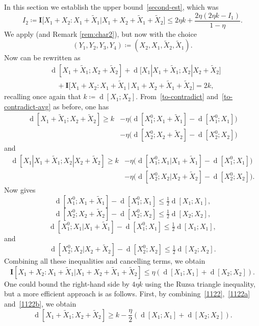 \documentclass[12pt,reqno,tbtags]{amsart}
\theoremstyle{definition}
\theoremstyle{remark}
\renewcommand{\leq}{\leqslant}
\renewcommand{\geq}{\geqslant}
\newcommand{\I}[1]{\mathbf{I}[#1]}
\newcommand{\bigI}[1]{\mathbf{I}\big[#1\big]}
\newcommand{\dist}[2]{{\operatorname{d}[#1;#2]}} %
\newcommand{\costa}[1]{\eta\bigl(\dist{X_1^0}{#1} - \dist{X_1^0}{X_1}\bigr)} %
\newcommand{\costb}[1]{\eta\bigl(\dist{X_2^0}{#1} - \dist{X_2^0}{X_2}\bigr)} %
\newcommand{\bigdist}[2]{{\operatorname{d}\bigl[#1;#2\bigr]}} %
\numberwithin{equation}{section}
\begin{document}
In this section we establish the upper bound~\eqref{second-est}, which was
\[
  I_2 \coloneqq \bigI{ X_1+X_2 : X_1 + \tilde X_1 | X_1+X_2+\tilde X_1+\tilde X_2 } \leq 2 \eta k + \frac{2 \eta (2 \eta k - I_1)}{1 - \eta}.
\]
We apply  (and Remark \ref{rem:char2}), but now with the choice
\[
  (Y_1,Y_2,Y_3,Y_4) \coloneqq (X_2, X_1, \tilde X_2, \tilde X_1).
\]
Now  can be rewritten as
\begin{align*}
  &\dist{X_1+\tilde X_1}{X_2+\tilde X_2} + \bigdist{X_1|X_1+\tilde X_1}{X_2|X_2+\tilde X_2} \\
  &\quad + \bigI{ X_1+X_2 : X_1 + \tilde X_1 \,|\, X_1+X_2+\tilde X_1+\tilde X_2 } = 2k,
\end{align*}
recalling once again that $k \coloneqq \dist{X_1}{X_2}$.  From~\eqref{to-contradict} and~\eqref{to-contradict-avg} as before, one has
\begin{align}
  \nonumber
  \dist{X_1+\tilde X_1}{X_2+\tilde X_2} \geq k &- \costa{X_1+\tilde X_1} \\ &- \costb{X_2+\tilde X_2}
\label{1122}
\end{align}
and
\begin{align*}
  \dist{X_1|X_1+\tilde X_1}{X_2|X_2+\tilde X_2}   \geq k &- \costa{X_1|X_1+\tilde X_1} \\& - \costb{X_2|X_2+\tilde X_2} .
\end{align*}
Now  gives
\begin{equation}\label{1122a} \dist{X^0_1}{X_1+\tilde X_1} - \dist{X^0_1}{X_1} \leq \tfrac{1}{2} \dist{X_1}{X_1},\end{equation}
\begin{equation}\label{1122b}
  \dist{X^0_2}{X_2+\tilde X_2} - \dist{X^0_2}{X_2} \leq \tfrac{1}{2} \dist{X_2}{X_2},
\end{equation}
\[
  \dist{X^0_1}{X_1|X_1+\tilde X_1} -  \dist{X^0_1}{X_1} \leq  \tfrac{1}{2} \dist{X_1}{X_1},
\]
and
\[
  \dist{X^0_2}{X_2|X_2+\tilde X_2} -  \dist{X^0_2}{X_2} \leq \tfrac{1}{2} \dist{X_2}{X_2}.
  \]
Combining all these inequalities and cancelling terms, we obtain
\begin{equation}\label{combined}
\I{ X_1+X_2 : X_1 + \tilde X_1 | X_1+X_2+\tilde X_1+\tilde X_2 } \leq \eta ( \dist{X_1}{X_1} + \dist{X_2}{X_2} ).
\end{equation}
One could bound the right-hand side by $4\eta k$ using the Ruzsa triangle inequality, but a more efficient approach is as follows.  First, by combining~\eqref{1122},~\eqref{1122a} and~\eqref{1122b}, we obtain
\begin{equation}\label{d12}
  \dist{X_1+\tilde X_1}{X_2+\tilde X_2} \geq k - \frac{\eta}{2} ( \dist{X_1}{X_1} + \dist{X_2}{X_2} ).
\end{equation}
\end{document}
